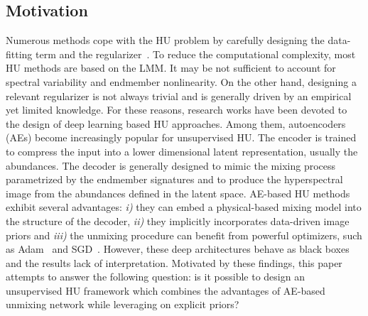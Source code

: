 \documentclass[journal,a4paper]{IEEEtran}
\begin{document}
\subsection{Motivation}
Numerous methods cope with the HU problem by carefully designing the data-fitting term and the regularizer~\cite{zhang2022sparse,peng2021low}. To reduce the computational complexity, most HU methods are based on the LMM. It may be not sufficient to account for spectral variability and endmember nonlinearity. On the other hand, designing a relevant regularizer is not always trivial and is generally driven by an empirical yet limited knowledge. For these reasons, research works have been devoted to the design of deep learning based HU approaches. Among them, autoencoders (AEs) become increasingly popular for unsupervised HU. The encoder is trained to compress the input into a lower dimensional latent representation, usually the abundances. The decoder is generally designed to mimic the  mixing process parametrized by the endmember signatures and to produce the hyperspectral image from the abundances defined in the latent space.
AE-based HU methods exhibit several advantages: \emph{i)} they can embed a physical-based mixing model into the structure of the decoder, \emph{ii)} they implicitly incorporates data-driven image priors and \emph{iii)} the unmixing procedure can benefit from powerful optimizers, such as Adam~\cite{kingma2014adam} and SGD~\cite{sutskever2013importance}. However, these deep architectures behave as black boxes and the results lack of interpretation. Motivated by these findings, this paper attempts to answer the following question: is it possible to design an unsupervised HU framework which combines the advantages of AE-based unmixing network while leveraging on explicit priors?
\end{document}
